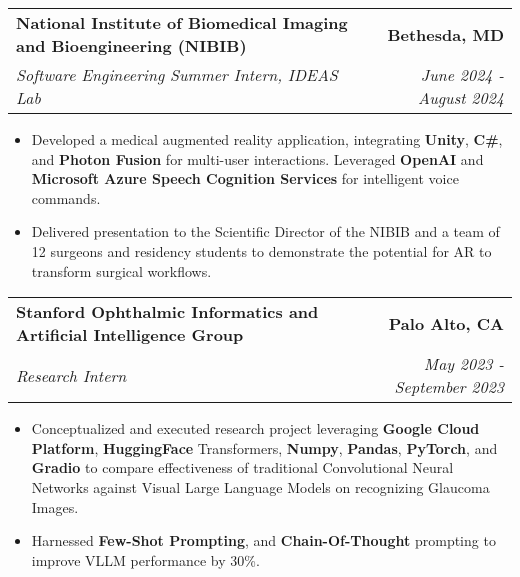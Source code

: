 \documentclass[letterpaper,11pt]{article}
\makeatletter
\newcommand{\resumeItem}[1]{
  \item\small{
    {#1 \vspace{-3pt}}
  }
}
\newcommand{\resumeSubheading}[4]{
  \vspace{-3pt}\item
    \begin{tabular*}{1.0\textwidth}[t]{l@{\extracolsep{\fill}}r}
      \textbf{#1} & \textbf{\small #2} \\
      \textit{\small#3} & \textit{\small #4} \\
    \end{tabular*}\vspace{-7pt}
}
\newcommand{\resumeItemListStart}{\begin{itemize}}
\newcommand{\resumeItemListEnd}{\end{itemize}\vspace{0pt}}
\makeatother
\begin{document}
        \resumeSubheading
        {National Institute of Biomedical Imaging and Bioengineering (NIBIB)}{Bethesda, MD}
            {Software Engineering Summer Intern, IDEAS Lab}{June 2024 - August 2024}
            \resumeItemListStart
                \resumeItem{Developed a medical augmented reality application, integrating \textbf{Unity}, \textbf{C\#}, and \textbf{Photon Fusion} for multi-user interactions. Leveraged \textbf{OpenAI} and \textbf{Microsoft Azure Speech Cognition Services} for intelligent voice commands.}
                \resumeItem{Delivered presentation to the Scientific Director of the NIBIB and a team of 12 surgeons and residency students to demonstrate the potential for AR to transform surgical workflows.}
            \resumeItemListEnd


        \resumeSubheading
        {Stanford Ophthalmic Informatics and Artificial Intelligence Group}{Palo Alto, CA}
            {Research Intern}{May 2023 - September 2023}
            \resumeItemListStart
                \resumeItem{Conceptualized and executed research project leveraging \textbf{Google Cloud Platform}, \textbf{HuggingFace} Transformers, \textbf{Numpy}, \textbf{Pandas}, \textbf{PyTorch}, and \textbf{Gradio} to compare effectiveness of traditional Convolutional Neural Networks against Visual Large Language Models on recognizing Glaucoma Images.}
                \resumeItem{
                 Harnessed \textbf{Few-Shot Prompting}, and \textbf{Chain-Of-Thought} prompting to improve VLLM performance by 30\%.
                }
            \resumeItemListEnd
            
\end{document}
